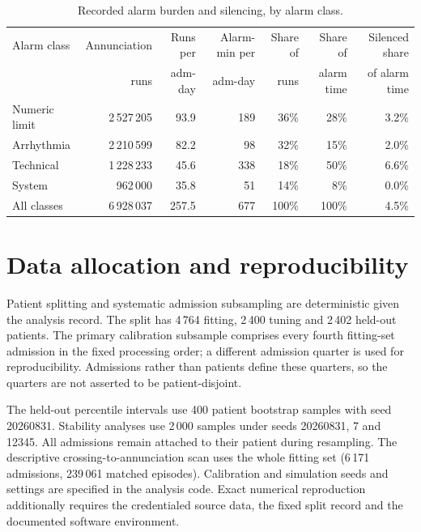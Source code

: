 \documentclass[11pt,letterpaper]{article}
\begin{document}
\begin{table}[htbp]\centering\small
\caption{Recorded alarm burden and silencing, by alarm class.}
\label{tab:burden}
\begin{tabular}{lrrrrrr}
\toprule
Alarm class & Annunciation & Runs per & Alarm-min per & Share of & Share of & Silenced share \\
 & runs & adm-day & adm-day & runs & alarm time & of alarm time \\
\midrule
Numeric limit & 2\,527\,205 & 93.9 & 189 & 36\% & 28\% & 3.2\% \\
Arrhythmia & 2\,210\,599 & 82.2 & 98 & 32\% & 15\% & 2.0\% \\
Technical & 1\,228\,233 & 45.6 & 338 & 18\% & 50\% & 6.6\% \\
System & 962\,000 & 35.8 & 51 & 14\% & 8\% & 0.0\% \\
\midrule
All classes & 6\,928\,037 & 257.5 & 677 & 100\% & 100\% & 4.5\% \\
\bottomrule
\end{tabular}
\end{table}












\section{Data allocation and reproducibility}\label{s:split}\label{s:seeds}

Patient splitting and systematic admission subsampling are deterministic given the analysis record. The split has 4\,764 fitting, 2\,400 tuning and 2\,402 held-out patients. The primary calibration subsample comprises every fourth fitting-set admission in the fixed processing order; a different admission quarter is used for reproducibility. Admissions rather than patients define these quarters, so the quarters are not asserted to be patient-disjoint.

The held-out percentile intervals use 400 patient bootstrap samples with seed 20260831. Stability analyses use 2\,000 samples under seeds 20260831, 7 and 12345. All admissions remain attached to their patient during resampling. The descriptive crossing-to-annunciation scan uses the whole fitting set (6\,171 admissions, 239\,061 matched episodes). Calibration and simulation seeds and settings are specified in the analysis code. Exact numerical reproduction additionally requires the credentialed source data, the fixed split record and the documented software environment.
\end{document}
